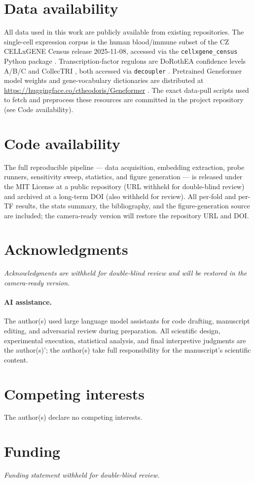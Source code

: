 \documentclass[10pt]{article}
\begin{document}
\section*{Data availability}

All data used in this work are publicly available from existing repositories. The single-cell expression corpus is the human blood/immune subset of the CZ CELLxGENE Census release 2025-11-08, accessed via the \texttt{cellxgene\_census} Python package \citep{cellxgene2025}. Transcription-factor regulons are DoRothEA confidence levels A/B/C \citep{garciaalonso2019dorothea} and CollecTRI \citep{mullerdott2023collectri}, both accessed via \texttt{decoupler} \citep{badiaimompel2022decoupler}. Pretrained Geneformer model weights and gene-vocabulary dictionaries are distributed at \url{https://huggingface.co/ctheodoris/Geneformer} \citep{theodoris2023}. The exact data-pull scripts used to fetch and preprocess these resources are committed in the project repository (see Code availability).

\section*{Code availability}

The full reproducible pipeline --- data acquisition, embedding extraction, probe runners, sensitivity sweep, statistics, and figure generation --- is released under the MIT License at a public repository (URL withheld for double-blind review) and archived at a long-term DOI (also withheld for review). All per-fold and per-TF results, the stats summary, the bibliography, and the figure-generation source are included; the camera-ready version will restore the repository URL and DOI.

\section*{Acknowledgments}

\textit{Acknowledgments are withheld for double-blind review and will be restored in the camera-ready version.}

\paragraph{AI assistance.} The author(s) used large language model assistants for code drafting, manuscript editing, and adversarial review during preparation. All scientific design, experimental execution, statistical analysis, and final interpretive judgments are the author(s)'; the author(s) take full responsibility for the manuscript's scientific content.

\section*{Competing interests}

The author(s) declare no competing interests.

\section*{Funding}

\textit{Funding statement withheld for double-blind review.}



\end{document}
